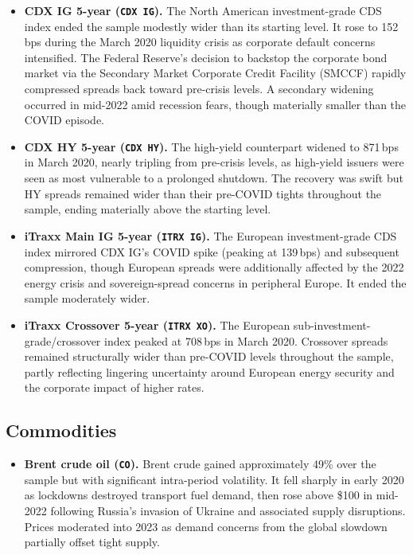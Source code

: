 \begin{itemize}
  \item \textbf{CDX IG 5-year (\texttt{CDX IG}).}
    The North American investment-grade CDS index ended the sample modestly
    wider than its starting level. It rose to 152\,bps during the
    March 2020 liquidity crisis as corporate default concerns intensified. The
    Federal Reserve's decision to backstop the corporate bond market via the
    Secondary Market Corporate Credit Facility (SMCCF) rapidly compressed
    spreads back toward pre-crisis levels. A secondary widening occurred in
    mid-2022 amid recession fears, though materially smaller than the COVID
    episode.

  \item \textbf{CDX HY 5-year (\texttt{CDX HY}).}
    The high-yield counterpart widened to 871\,bps in March 2020, nearly
    tripling from pre-crisis levels, as high-yield issuers were seen as most
    vulnerable to a prolonged shutdown. The recovery was swift but HY spreads
    remained wider than their pre-COVID tights throughout the sample, ending
    materially above the starting level.

  \item \textbf{iTraxx Main IG 5-year (\texttt{ITRX IG}).}
    The European investment-grade CDS index mirrored CDX IG's COVID spike
    (peaking at 139\,bps) and subsequent compression, though European spreads
    were additionally affected by the 2022 energy crisis and sovereign-spread
    concerns in peripheral Europe. It ended the sample moderately wider.

  \item \textbf{iTraxx Crossover 5-year (\texttt{ITRX XO}).}
    The European sub-investment-grade/crossover index peaked at 708\,bps in
    March 2020. Crossover spreads remained structurally wider than pre-COVID
    levels throughout the sample, partly reflecting lingering uncertainty
    around European energy security and the corporate impact of higher rates.
\end{itemize}

\subsection*{Commodities}

\begin{itemize}
  \item \textbf{Brent crude oil (\texttt{CO}).}
    Brent crude gained approximately 49\% over the sample but with significant
    intra-period volatility. It fell sharply in early 2020 as lockdowns
    destroyed transport fuel demand, then rose above \$100 in mid-2022
    following Russia's invasion of Ukraine and associated supply disruptions.
    Prices moderated into 2023 as demand concerns from the global slowdown
    partially offset tight supply.
\end{itemize}


